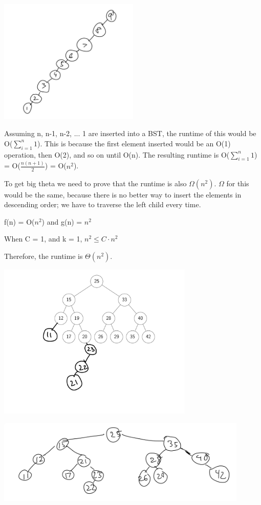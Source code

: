 \documentclass[11pt,largemargins]{homework}
\begin{document}
\begin{alphaparts}
  \questionpart
  \includegraphics[width=0.5\textwidth]{pictures/hw3/q4a.jpeg}

  Assuming n, n-1, n-2, ... 1 are inserted into a BST, the runtime of this would be O($\sum_{i=1}^{n} 1$).
  This is because the first element inserted would be an O(1) operation, then O(2), and so on until O(n).
  The resulting runtime is O($\sum_{i=1}^{n} 1$) = O($\frac{n(n+1)}{2}$) = O($n^2$).


  To get big theta we need to prove that the runtime is also $\Omega(n^2)$.
  $\Omega$ for this would be the same, because there is no better way to insert the elements in descending order; we have to traverse the left child every time.
  
  f(n) = O($n^2$) and g(n) = $n^2$

  When C = 1, and k = 1, $n^2 \leq C \cdot n^2$

  
  Therefore, the runtime is $\Theta(n^2)$.

  \questionpart
  \includegraphics[width=0.7\textwidth]{pictures/hw3/q4b.jpeg}

  \questionpart
  \includegraphics[width=0.9\textwidth]{pictures/hw3/q4c.jpeg}


\end{alphaparts}
\end{document}
